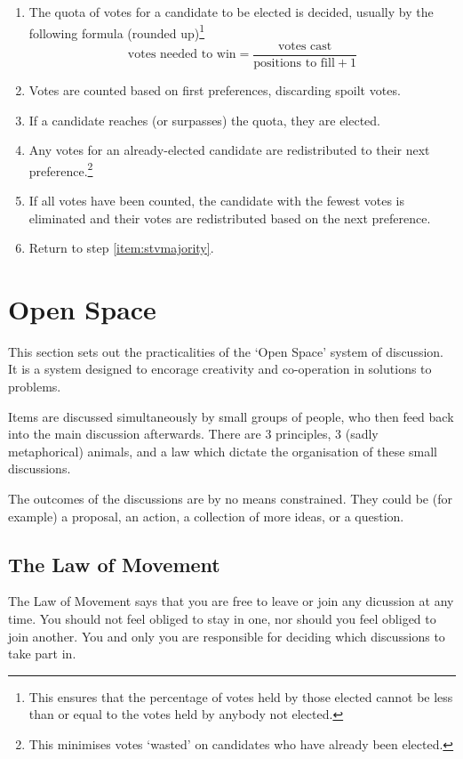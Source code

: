 \documentclass[a4paper, 11pt]{article} %
\begin{document}
\begin{enumerate}
\item The quota of votes for a candidate to be elected is decided, usually by the following formula (rounded up)\footnote{This ensures that the percentage of votes held by those elected cannot be less than or equal to the votes held by anybody not elected.} \[\mbox{votes needed to win} = \frac{\mbox{votes cast}}{\mbox{positions to fill}+ 1} \]
\item Votes are counted based on first preferences, discarding spoilt votes.
\item \label{item:stvmajority} If a candidate reaches (or surpasses) the quota, they are elected.
\item Any votes for an already-elected candidate are redistributed to their next preference.\footnote{This minimises votes `wasted' on candidates who have already been elected.}
\item If all votes have been counted, the candidate with the fewest votes is eliminated and their votes are redistributed based on the next preference.
\item Return to step \ref{item:stvmajority}.
\end{enumerate}

\appendix

\section{Open Space}
\label{sec:openspace}
This section sets out the practicalities of the `Open Space' system of discussion.  It is a system designed to encorage creativity and co-operation in solutions to problems.

Items are discussed simultaneously by small groups of people, who then feed back into the main discussion afterwards.  There are 3 principles, 3 (sadly metaphorical) animals, and a law which dictate the organisation of these small discussions.

The outcomes of the discussions are by no means constrained.  They could be (for example) a proposal, an action, a collection of more ideas, or a question.

\subsection{The Law of Movement}
The Law of Movement says that you are free to leave or join any dicussion at any time.  You should not feel obliged to stay in one, nor should you feel obliged to join another.  You and only you are responsible for deciding which discussions to take part in.
\end{document}
